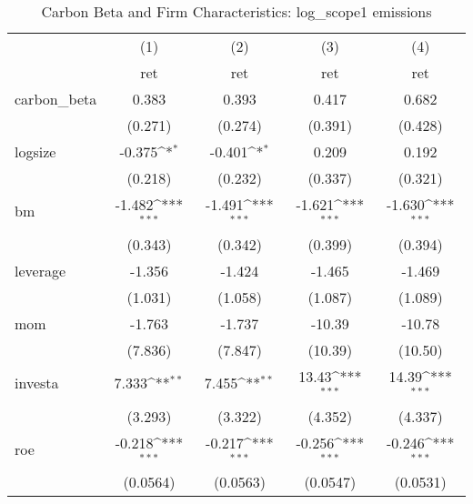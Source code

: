 \begin{table}[htbp]\centering
\def\sym#1{\ifmmode^{#1}\else\(^{#1}\)\fi}
\caption{Carbon Beta and Firm Characteristics: log\_scope1 emissions}
\begin{tabular}{l*{4}{c}}
\hline\hline
                    &\multicolumn{1}{c}{(1)}&\multicolumn{1}{c}{(2)}&\multicolumn{1}{c}{(3)}&\multicolumn{1}{c}{(4)}\\
                    &\multicolumn{1}{c}{ret}&\multicolumn{1}{c}{ret}&\multicolumn{1}{c}{ret}&\multicolumn{1}{c}{ret}\\
\hline
carbon\_beta         &       0.383         &       0.393         &       0.417         &       0.682         \\
                    &     (0.271)         &     (0.274)         &     (0.391)         &     (0.428)         \\
[1em]
logsize             &      -0.375\sym{*}  &      -0.401\sym{*}  &       0.209         &       0.192         \\
                    &     (0.218)         &     (0.232)         &     (0.337)         &     (0.321)         \\
[1em]
bm                  &      -1.482\sym{***}&      -1.491\sym{***}&      -1.621\sym{***}&      -1.630\sym{***}\\
                    &     (0.343)         &     (0.342)         &     (0.399)         &     (0.394)         \\
[1em]
leverage            &      -1.356         &      -1.424         &      -1.465         &      -1.469         \\
                    &     (1.031)         &     (1.058)         &     (1.087)         &     (1.089)         \\
[1em]
mom                 &      -1.763         &      -1.737         &      -10.39         &      -10.78         \\
                    &     (7.836)         &     (7.847)         &     (10.39)         &     (10.50)         \\
[1em]
investa             &       7.333\sym{**} &       7.455\sym{**} &       13.43\sym{***}&       14.39\sym{***}\\
                    &     (3.293)         &     (3.322)         &     (4.352)         &     (4.337)         \\
[1em]
roe                 &      -0.218\sym{***}&      -0.217\sym{***}&      -0.256\sym{***}&      -0.246\sym{***}\\
                    &    (0.0564)         &    (0.0563)         &    (0.0547)         &    (0.0531)         \\

\end{tabular}
\end{table}
